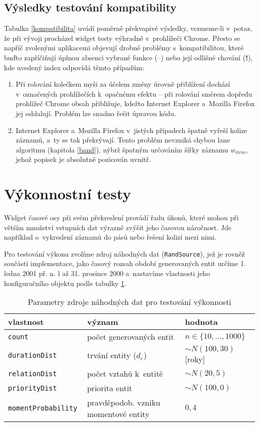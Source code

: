 		\subsection{Výsledky testování kompatibility}
			Tabulka \ref{kompatibilita} uvádí poměrně překvapivé výsledky, vezmeme-li v~potaz, že při vývoji procházel widget testy výhradně v~prohlížeči {\sf Chrome}. Přesto se napříč zvolenými aplikacemi objevují drobné problémy s~kompatibilitou, které buďto zapříčiňují úplnou absenci vybrané funkce (--) nebo její odlišné chování ({\bf !}), kde uvedený index odpovídá těmto případům:
			\begin{enumerate}
				\item Při rolování kolečkem myši za účelem změny úrovně přiblížení dochází v~označených prohlížečích k~opačnému efektu -- při rolování směrem dopředu prohlížeč {\sf Chrome} obsah přibližuje, kdežto {\sf Internet Explorer} a~{\sf Mozilla Firefox} jej oddalují. Problém lze snadno řešit úpravou kódu.
				\item {\sf Internet Explorer} a~{\sf Mozilla Firefox} v~jistých případech špatně vyřeší kolize záznamů, a~ty se tak překrývají. Tento problém nevzniká chybou lane algoritmu (kapitola \ref{band}), nýbrž špatným určováním šířky záznamu $w_{item}$, jehož popisek je absolutně pozicován uvnitř.
			\end{enumerate}
			
	\section{Výkonnostní testy}
		Widget časové osy při svém překreslení provádí řadu úkonů, které mohou při větším množství vstupních dat výrazně zvýšit jeho časovou náročnost. Jde napří\-klad o~vykreslení záznamů do pásů nebo řešení kolizí mezi nimi.
		
		Pro testování výkonu zvolíme zdroj náhodných dat ({\tt RandSource}), jež je rov\-něž součástí implementace, jako časový rozsah období generovaných entit určíme 1. ledna 2001 př. n. l až 31. prosince 2000 a~nastavíme vlastnosti jeho konfiguračního objektu podle tabulky \ref{tab:conf-obj-rand}.
		\begin{table}[h!]
			\begin{tabular}{|p{}p{}p{}|}
				\hline			
				\bf vlastnost& \bf význam & \bf hodnota \\
				\hline
				\tt count & počet generovaných entit & $n\in\{10, ..., 1000\}$ \\
				\tt durationDist & trvání entity ($d_e$)& $\sim N(100, 30)$ [roky]\\
				\tt relationDist & počet vztahů k~entitě & $\sim N(20, 5)$\\
				\tt priorityDist & priorita entit & $\sim N(100, 0)$\\
				\tt momentProbability & pravděpodob. vzniku momen\-tové entity & $0,\!4$\\
				\hline
			\end{tabular}
			\caption{Parametry zdroje náhodných dat pro testování výkonnosti}
			\label{tab:conf-obj-rand}
		\end{table}
		
